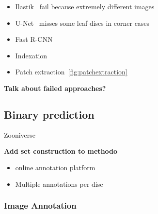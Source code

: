 \documentclass[english]{article}
\begin{document}
\begin{itemize}
	\item Ilastik~\parencite{bergIlastikInteractiveMachine2019} fail because extremely different images
	\item U-Net~\parencite{ronnebergerUNetConvolutionalNetworks2015} misses some leaf discs in corner cases
	\item Fast R-CNN~\parencite{girshickFastRCNN2015}
	\item Indexation
	\item Patch extraction~\ref{fig:patchextraction}
\end{itemize}

\textbf{Talk about failed approaches?}

\subsection{Binary prediction}
Zooniverse \parencite{zooniverse}

\textbf{Add set construction to methodo}

\begin{itemize}
	\item online annotation platform
	\item Multiple annotations per disc
\end{itemize}

\subsubsection{Image Annotation}
\end{document}
